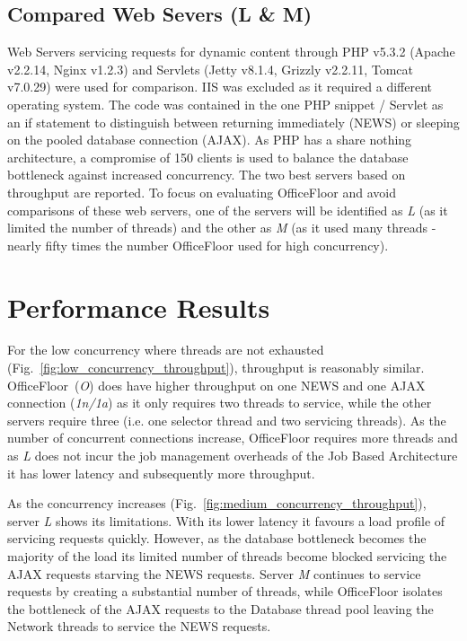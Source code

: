 \documentclass[conference]{ieee/IEEEtran}
\begin{document}
\subsection{Compared Web Severs (L \& M)}
Web Servers servicing requests for dynamic content through PHP v5.3.2 (Apache
v2.2.14, Nginx v1.2.3) and Servlets (Jetty v8.1.4, Grizzly v2.2.11, Tomcat
v7.0.29) were used for comparison.  IIS was excluded as it required a different
operating system.  The code was contained in the one PHP snippet / Servlet as an
if statement to distinguish between returning immediately (NEWS) or sleeping on
the pooled database connection (AJAX).  As PHP has a share nothing architecture,
a compromise of 150 clients is used to balance the database bottleneck against
increased concurrency.  The two best servers based on throughput are reported.
To focus on evaluating OfficeFloor and avoid comparisons of these web servers,
one of the servers will be identified as \textit{L} (as it limited the number of
threads) and the other as \textit{M} (as it used many threads - nearly fifty
times the number OfficeFloor used for high concurrency).



\section{Performance Results}
For the low concurrency where threads are not exhausted
(Fig.~\ref{fig:low_concurrency_throughput}), throughput is reasonably similar.
OfficeFloor~(\textit{O}) does have higher throughput on one NEWS and one AJAX
connection (\textit{1n/1a}) as it only requires two threads to service, while
the other servers require three (i.e. one selector thread and two servicing
threads).  As the number of concurrent connections increase, OfficeFloor
requires more threads and as \textit{L} does not incur the job management
overheads of the Job Based Architecture it has lower latency and subsequently
more throughput.

As the concurrency increases (Fig.~\ref{fig:medium_concurrency_throughput}),
server \textit{L} shows its limitations.  With its lower latency it favours a
load profile of servicing requests quickly.  However, as the database bottleneck
becomes the majority of the load its limited number of threads become blocked
servicing the AJAX requests starving the NEWS requests.  Server \textit{M}
continues to service requests by creating a substantial number of threads, while
OfficeFloor isolates the bottleneck of the AJAX requests to the Database thread
pool leaving the Network threads to service the NEWS requests.
\end{document}
